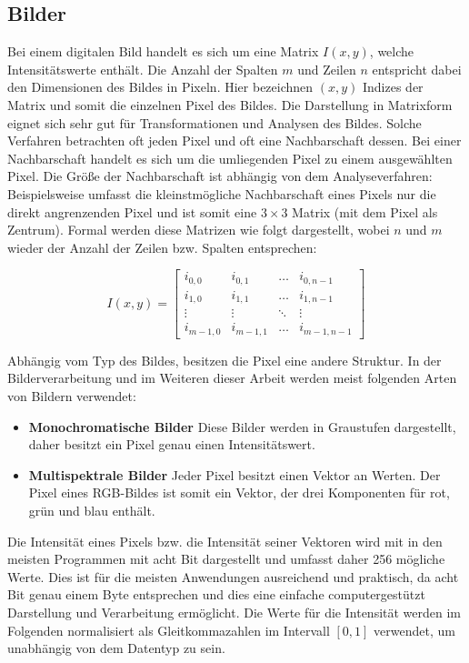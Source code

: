 \subsection{Bilder}

Bei einem digitalen Bild handelt es sich um eine Matrix $I(x, y)$, welche Intensitätswerte enthält. Die Anzahl der Spalten $m$ und Zeilen $n$ entspricht dabei den Dimensionen des Bildes in Pixeln. Hier bezeichnen $(x, y)$ Indizes der Matrix und somit die einzelnen Pixel des Bildes. Die Darstellung in Matrixform eignet sich  sehr gut für Transformationen und Analysen des Bildes. Solche Verfahren betrachten oft jeden Pixel und oft eine Nachbarschaft dessen. Bei einer Nachbarschaft handelt es sich um die umliegenden Pixel zu einem ausgewählten Pixel. Die Größe der Nachbarschaft ist abhängig von dem Analyseverfahren: Beispielsweise umfasst die kleinstmögliche Nachbarschaft eines Pixels nur die direkt angrenzenden Pixel und ist somit eine $3 \times 3$ Matrix (mit dem Pixel als Zentrum). Formal werden diese Matrizen wie folgt dargestellt, wobei $n$ und $m$ wieder der Anzahl der Zeilen bzw. Spalten entsprechen:

$$
I(x, y) = \begin{bmatrix}
i_{0, 0}   & i_{0, 1}	& \dots	 & i_{0, n-1}   \\
i_{1, 0}   & i_{1, 1}   & \dots  & i_{1, n-1}   \\
\vdots	   & \vdots 	& \ddots & \vdots       \\
i_{m-1, 0} & i_{m-1, 1} & \dots	 & i_{m-1, n-1}
\end{bmatrix}
$$ 

Abhängig vom Typ des Bildes, besitzen die Pixel eine andere Struktur. In der Bilderverarbeitung und im Weiteren dieser Arbeit werden meist folgenden Arten von Bildern verwendet:

\begin{itemize}
	\item \textbf{Monochromatische Bilder} Diese Bilder werden in Graustufen dargestellt, daher besitzt ein Pixel genau einen Intensitätswert.
	\item \textbf{Multispektrale Bilder} Jeder Pixel besitzt einen Vektor an Werten. Der Pixel eines RGB-Bildes ist somit ein Vektor, der drei Komponenten für  rot, grün und blau enthält.
\end{itemize}

Die Intensität eines Pixels bzw. die Intensität seiner Vektoren wird mit in den meisten Programmen mit acht Bit dargestellt und umfasst daher 256 mögliche Werte. Dies ist für die meisten Anwendungen ausreichend und praktisch, da acht Bit genau einem Byte entsprechen und dies eine einfache computergestützt Darstellung und Verarbeitung ermöglicht. Die Werte für die Intensität werden im Folgenden normalisiert als Gleitkommazahlen im Intervall $[0, 1]$ verwendet, um unabhängig von dem Datentyp zu sein. 

